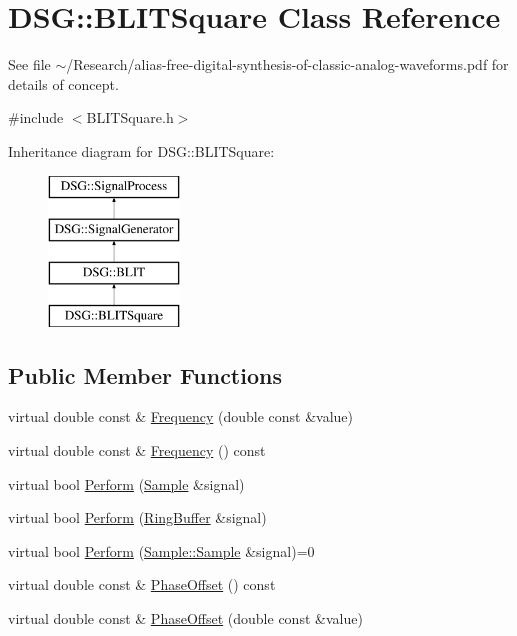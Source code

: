 \hypertarget{classDSG_1_1BLITSquare}{\section{D\+S\+G\+:\+:B\+L\+I\+T\+Square Class Reference}
\label{classDSG_1_1BLITSquare}
}


See file $\sim$/\+Research/alias-\/free-\/digital-\/synthesis-\/of-\/classic-\/analog-\/waveforms.pdf for details of concept.  




{\ttfamily \#include $<$B\+L\+I\+T\+Square.\+h$>$}

Inheritance diagram for D\+S\+G\+:\+:B\+L\+I\+T\+Square\+:\begin{figure}[H]
\begin{center}
\leavevmode
\includegraphics[height=4.000000cm]{classDSG_1_1BLITSquare}
\end{center}
\end{figure}
\subsection*{Public Member Functions}
\begin{DoxyCompactItemize}
\item 
virtual double const \& \hyperlink{classDSG_1_1BLIT_a67b698a54f37c361945cae3e137af76f}{Frequency} (double const \&value)
\item 
virtual double const \& \hyperlink{classDSG_1_1SignalGenerator_aedac746c5a70818d120858542ecb7c45}{Frequency} () const 
\item 
virtual bool \hyperlink{classDSG_1_1BLIT_a0f769ac63ee884a6d3899b38d6c2944c}{Perform} (\hyperlink{classDSG_1_1Sample}{Sample} \&signal)
\item 
virtual bool \hyperlink{classDSG_1_1BLIT_ae464457074d366c46f42b53b59d82ecb}{Perform} (\hyperlink{classDSG_1_1RingBuffer}{Ring\+Buffer} \&signal)
\item 
virtual bool \hyperlink{classDSG_1_1SignalProcess_afdb8220100418893950c1161dd24db67}{Perform} (\hyperlink{classDSG_1_1Sample_aaf2e30d73911eccea99b53eeee15b612}{Sample\+::\+Sample} \&signal)=0
\item 
virtual double const \& \hyperlink{classDSG_1_1SignalGenerator_a1ce521847edd0b837fd840998f906b4b}{Phase\+Offset} () const 
\item 
virtual double const \& \hyperlink{classDSG_1_1SignalGenerator_a08b71b1f30ba65e629642c570291dc0e}{Phase\+Offset} (double const \&value)
\end{DoxyCompactItemize}
